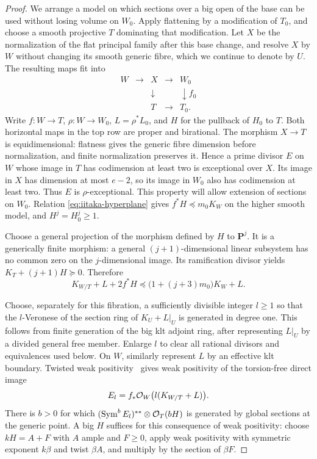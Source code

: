 \begin{proof}
We arrange a model on which sections over a big open of the base
can be used without losing volume on $W_0$.  Apply flattening by a
modification of $T_0$, and choose a smooth projective $T$ dominating
that modification.  Let $X$ be the normalization of the flat
principal family after this base change, and resolve $X$ by $W$
without changing its smooth generic fibre, which we continue to denote
by $U$.
The resulting maps fit into
\[
\begin{array}{ccccc}
 W&\longrightarrow&X&\longrightarrow&W_0\\
 &&\downarrow&&\downarrow f_0\\
 &&T&\longrightarrow&T_0.
\end{array}
\]
Write $f:W\to T$, $\rho:W\to W_0$, $L=\rho^*L_0$, and
$H$ for the pullback of $H_0$ to $T$.  Both horizontal maps in
the top row are proper and birational.  The morphism $X\to T$
is equidimensional: flatness gives the generic fibre dimension
before normalization, and finite normalization preserves it.
Hence a prime divisor $E$ on $W$ whose image in $T$ has codimension
at least two is exceptional over $X$.  Its image in $X$ has
dimension at most $e-2$, so its image in $W_0$ also has codimension
at least two.  Thus $E$ is $\rho$-exceptional.  This property will
allow extension of sections on $W_0$.  Relation
\eqref{eq:iitaka-hyperplane} gives $f^*H\preceq m_0K_W$ on the
higher smooth model, and $H^j=H_0^j\ge1$.

Choose a general projection of the morphism defined by $H$ to
$\mathbf P^j$.  It is a generically finite morphism: a general
$(j+1)$-dimensional linear subsystem has no common zero on the
$j$-dimensional image.  Its ramification divisor yields
$K_T+(j+1)H\succeq0$.  Therefore
\begin{equation}\label{eq:relative-adjoint-domination}
       K_{W/T}+L+2f^*H
              \preceq \bigl(1+(j+3)m_0\bigr)K_W+L.
\end{equation}

Choose, separately for this fibration, a sufficiently divisible
integer $l\ge1$ so that the $l$-Veronese of the section ring of
$K_U+L|_U$ is generated in degree one.  This follows from finite
generation of the big klt adjoint ring, after representing $L|_U$
by a divided general free member.  Enlarge $l$ to clear all
rational divisors and equivalences used below.  On $W$, similarly
represent $L$ by an effective klt boundary.  Twisted weak
positivity~\cite[Theorem~1.1]{Fujino2017} gives weak
positivity of the torsion-free direct image
\[
                    E_l=f_*\mathcal O_W\bigl(l(K_{W/T}+L)\bigr).
\]
There is $b>0$ for which
$(\operatorname{Sym}^b E_l)^{**}\otimes\mathcal O_T(bH)$ is generated
by global sections at the generic point.  A big $H$ suffices for
this consequence of weak positivity: choose $kH=A+F$ with $A$
ample and $F\ge0$, apply weak positivity with symmetric exponent
$k\beta$ and twist $\beta A$, and multiply by the section of
$\beta F$.


\end{proof}

